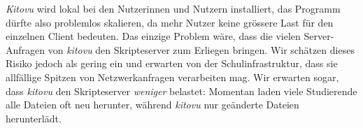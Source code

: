 \documentclass[a4paper]{article}
\begin{document}
\emph{Kitovu} wird lokal bei den Nutzerinnen und Nutzern installiert, das Programm dürfte also problemlos skalieren, da mehr Nutzer keine grössere Last für den einzelnen Client bedeuten. Das einzige Problem wäre, dass die vielen Server-Anfragen von \emph{kitovu} den Skripteserver zum Erliegen bringen. Wir schätzen dieses Risiko jedoch als gering ein und erwarten von der Schulinfrastruktur, dass sie allfällige Spitzen von Netzwerkanfragen verarbeiten mag. Wir erwarten sogar, dass  \emph{kitovu} den Skripteserver \emph{weniger} belastet: Momentan laden viele Studierende alle Dateien oft neu herunter, während \emph{kitovu} nur geänderte Dateien herunterlädt.
\end{document}
